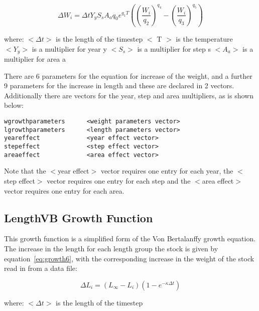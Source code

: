 \documentclass[10pt,twoside]{book}
\begin{document}
\begin{equation}\label{eq:growth5w}
\Delta W_{i} = \Delta t Y_{y} S_{s} A_{a} q_{0} e^{q_{1}T} \left( \left( \frac{W_{i}}{q_{2}} \right)^{q_{4}} - \left( \frac{W_{i}}{q_{3}} \right)^{q_{5}} \right)
\end{equation}

where:\newline
$<\Delta t>$ is the length of the timestep\newline
$<$ T $>$ is the temperature\newline
$<Y_{y}>$ is a multiplier for year y\newline
$<S_{s}>$ is a multiplier for step s\newline
$<A_{a}>$ is a multiplier for area a

\bigskip
There are 6 parameters for the equation for increase of the weight, and a further 9 parameters for the increase in length and these are declared in 2 vectors.  Additionally there are vectors for the year, step and area multipliers, as is shown below:

{\small\begin{verbatim}
wgrowthparameters      <weight parameters vector>
lgrowthparameters      <length parameters vector>
yeareffect             <year effect vector>
stepeffect             <step effect vector>
areaeffect             <area effect vector>
\end{verbatim}}

Note that the $<$year effect$>$ vector requires one entry for each year, the $<$step effect$>$ vector requires one entry for each step and the $<$area effect$>$ vector requires one entry for each area.

\subsection{LengthVB Growth Function}\label{subsec:growth6}
This growth function is a simplified form of the Von Bertalanffy growth equation.  The increase in the length for each length group the stock is given by equation~\ref{eq:growth6}, with the corresponding increase in the weight of the stock read in from a data file:

\begin{equation}\label{eq:growth6}
\Delta L_{i} = \left( L_{\infty} - L_{i} \right) \left( 1 - e^{-\kappa \Delta t} \right)
\end{equation}

where:\newline
$<\Delta t>$ is the length of the timestep
\end{document}
